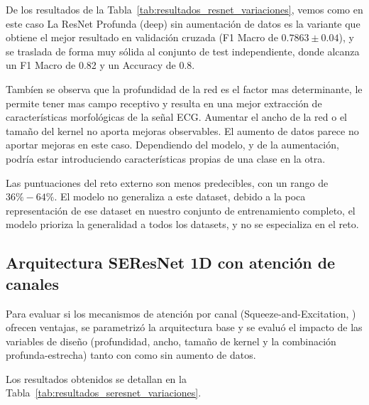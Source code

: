 De los resultados de la Tabla~\ref{tab:resultados_resnet_variaciones}, vemos como en este caso La ResNet Profunda (deep) sin aumentación
de datos es la variante que obtiene el mejor resultado en validación cruzada (F1 Macro de $0.7863 \pm 0.04$), y se traslada de forma muy sólida al conjunto de test independiente, donde alcanza un F1 Macro de
0.82 y un Accuracy de 0.8. 

Tambíen se observa que la profundidad de la red es el factor mas determinante, le permite tener mas campo receptivo y resulta
en una mejor extracción de características morfológicas de la señal ECG.
Aumentar el ancho de la red o el tamaño del kernel no aporta mejoras observables.
El aumento de datos parece no aportar mejoras en este caso. Dependiendo del modelo, y de la aumentación, podría estar introduciendo
características propias de una clase en la otra.

Las puntuaciones del reto externo son menos predecibles, con un rango de $36\%-64\%$. El modelo no generaliza
a este dataset, debido a la poca representación de ese dataset en nuestro conjunto de entrenamiento completo, el modelo prioriza
la generalidad a todos los datasets, y no se especializa en el reto.

\subsection{Arquitectura SEResNet 1D con atención de canales}
\label{subsec:resultados_seresnet}

Para evaluar si los mecanismos de atención por canal (Squeeze-and-Excitation, \cite{senet1d})
ofrecen ventajas, se parametrizó la arquitectura
base y se evaluó el impacto de las variables de diseño
(profundidad, ancho, tamaño de kernel y la combinación profunda-estrecha) tanto con como sin aumento
de datos.

Los resultados obtenidos se detallan en la Tabla~\ref{tab:resultados_seresnet_variaciones}.

